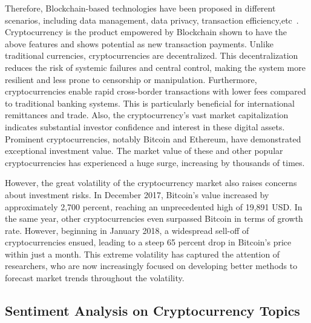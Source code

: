 Therefore, Blockchain-based technologies have been proposed in different scenarios, including data management, data privacy, transaction efficiency,etc~\cite{hu2023data, shae2018transform, ng2021ldsp}. Cryptocurrency is the product empowered by Blockchain shown to have the above features and shows potential as new transaction payments. Unlike traditional currencies, cryptocurrencies are decentralized. This decentralization reduces the risk of systemic failures and central control, making the system more resilient and less prone to censorship or manipulation. Furthermore, cryptocurrencies enable rapid cross-border transactions with lower fees compared to traditional banking systems. This is particularly beneficial for international remittances and trade. Also, the cryptocurrency's vast market capitalization indicates substantial investor confidence and interest in these digital assets. Prominent cryptocurrencies, notably Bitcoin and Ethereum, have demonstrated exceptional investment value. The market value of these and other popular cryptocurrencies has experienced a huge surge, increasing by thousands of times. 

However, the great volatility of the cryptocurrency market also raises concerns about investment risks. In December 2017, Bitcoin's value increased by approximately 2,700 percent, reaching an unprecedented high of 19,891 USD. In the same year, other cryptocurrencies even surpassed Bitcoin in terms of growth rate. However, beginning in January 2018, a widespread sell-off of cryptocurrencies ensued, leading to a steep 65 percent drop in Bitcoin's price within just a month. This extreme volatility has captured the attention of researchers, who are now increasingly focused on developing better methods to forecast market trends throughout the volatility.
\subsection{Sentiment Analysis on Cryptocurrency Topics}

